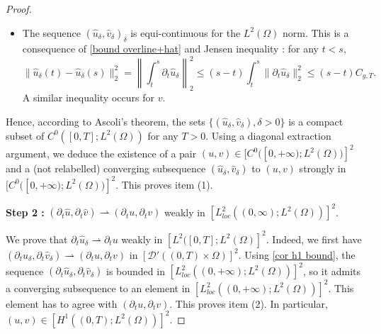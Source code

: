 \documentclass[reqno,12pt,twoside]{amsart}
\numberwithin{equation}{section} \numberwithin{theorem}{section}
\numberwithin{proposition}{section} \numberwithin{lemma}{section}
\numberwithin{corollary}{section}
\numberwithin{definition}{section} \numberwithin{remark}{section}
\begin{document}
\begin{proof}
\begin{itemize}
\item[$\bullet$] The sequence $(\hat{u}_\delta, \hat{v}_\delta)_\delta$ is equi-continuous for the $L^2(\Omega)$ norm. This is a consequence of \eqref{bound overline+hat} and Jensen inequality : for any $t<s$, 
\begin{equation}\label{eq : prop3.4 1}
\|\hat{u}_\delta (t) - \hat{u}_\delta(s)\|_2^2 = \left\|\int_t^s \partial_t \hat{u}_\delta\right\|_2^2 \leqslant (s-t) \int_t^s \|\partial_t \hat{u}_\delta \|_2^2\leqslant (s-t) C_{g,T}.
\end{equation}
A similar inequality occurs for $v$. 
\end{itemize} 
Hence, according to Ascoli's theorem, the sets $\{(\hat{u}_\delta, \hat{v}_\delta), \delta >0\}$ is a compact subset of $C^0([0,T]; L^2(\Omega))$ for any $T >0$. Using a diagonal extraction argument, we deduce the existence of a pair $(u,v) \in [C^0([0, +\infty) ; L^2(\Omega))]^2$ and a (not relabelled) converging subsequence $(\hat{u}_\delta, \hat{v}_\delta)$ to $(u,v)$ strongly in $[C^0([0,+\infty) ; L^2(\Omega))]^2$. 
This proves item (1).  

\medskip

\textbf{Step 2 :} $(\partial_t \hat{u}, \partial_t \hat{v}) \rightharpoonup (\partial_t u, \partial_t v)$ weakly in $[L_{loc}^2((0,\infty); L^2(\Omega))]^2$.  

We prove that $\partial_t \hat{u}_\delta \rightharpoonup \partial_t u$ weakly in $[L^2([0,T];L^2(\Omega)]^2$. Indeed, we first have $(\partial_t \hat{u}_\delta, \partial_t \hat{v}_\delta) \rightharpoonup  (\partial_t u, \partial_t v)$ in $[\mathcal{D}'((0,T)\times \Omega)]^2$. 
%
Using \autoref{cor h1 bound}, the sequence $(\partial_t \hat{u}_\delta, \partial_t \hat{v}_\delta)$ is bounded in $[L_{loc}^2((0,+\infty);L^2(\Omega))]^2$, so it admits a converging subsequence to an element in $[L_{loc}^2((0,+\infty);L^2(\Omega))]^2$. This element has to agree with $(\partial_t u, \partial_t v)$. This proves item (2). In particular, $(u,v)\in [H^1((0,T);L^2(\Omega))]^2$. 


\end{proof}
\end{document}
